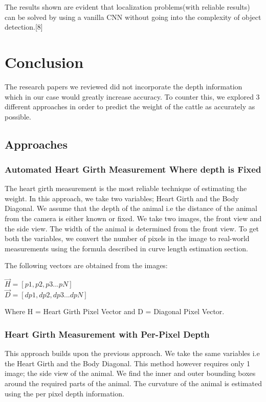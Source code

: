 The results shown are evident that localization problems(with reliable results) can be solved by using a vanilla CNN without going into the complexity of object detection.[8]



\section{Conclusion}

The research papers we reviewed did not incorporate the depth information which in our case would greatly increase accuracy. To counter this, we explored 3 different approaches in order to predict the weight of the cattle as accurately as possible.

\subsection{Approaches}

\subsubsection{Automated Heart Girth Measurement Where depth is Fixed}

The heart girth measurement is the most reliable technique of estimating the weight. In this approach, we take two variables; Heart Girth and the Body Diagonal. We assume that the depth of the animal i.e the distance of the animal from the camera is either known or fixed. We take two images, the front view and the side view. The width of the animal is determined from the front view. To get both the variables, we convert the number of pixels in the image to real-world measurements using the formula described in curve length estimation section. 

The following vectors are obtained from the images:

\begin{center}
$\vec H = [p1, p2, p3 ... pN]$\\
$\vec D = [dp1, dp2, dp3 ... dpN]$
\end{center}
Where H = Heart Girth Pixel Vector and D = Diagonal Pixel Vector.

\subsubsection{Heart Girth Measurement with Per-Pixel Depth}

This approach builds upon the previous approach. We take the same variables i.e the Heart Girth and the Body Diagonal. This method however requires only 1 image; the side view of the animal. We find the inner and outer bounding boxes around the required parts of the animal. The curvature of the animal is estimated using the per pixel depth information. 

